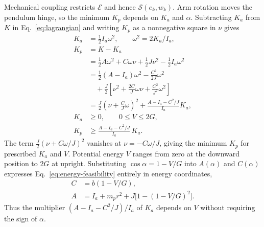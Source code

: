 \documentclass[letterpaper,10pt,conference]{ieeeconf}
\begin{document}
Mechanical coupling restricts $\mathcal E$ and hence $\mathcal S(e_k,w_k)$. Arm rotation moves the pendulum hinge, so the minimum $K_p$ depends on $K_a$ and $\alpha$. Subtracting $K_a$ from $K$ in Eq.~\eqref{eq:lagrangian} and writing $K_p$ as a nonnegative square in $\nu$ gives
\begin{equation}
\begin{aligned}
 K_a&=\tfrac12I_a\omega^2,\qquad \omega^2=2K_a/I_a,\\
 K_p&=K-K_a\\
    &=\tfrac12A\omega^2+C\omega\nu+\tfrac12J\nu^2
       -\tfrac12I_a\omega^2\\
    &=\tfrac12(A-I_a)\omega^2-\frac{C^2}{2J}\omega^2\\
    &\quad+\frac J2\left[\nu^2+\frac{2C}{J}\omega\nu
                    +\frac{C^2}{J^2}\omega^2\right]\\
    &=\frac J2\left(\nu+\frac CJ\omega\right)^2
       +\frac{A-I_a-C^2/J}{I_a}K_a,\\
 K_a&\ge0,\qquad 0\le V\le2G,\\
 K_p&\ge\frac{A-I_a-C^2/J}{I_a}\,K_a.
\end{aligned}
\label{eq:energy-feasibility}
\end{equation}
The term $\frac J2(\nu+C\omega/J)^2$ vanishes at $\nu=-C\omega/J$, giving the minimum $K_p$ for prescribed $K_a$ and $V$. Potential energy $V$ ranges from zero at the downward position to $2G$ at upright. Substituting $\cos\alpha=1-V/G$ into $A(\alpha)$ and $C(\alpha)$ expresses Eq.~\eqref{eq:energy-feasibility} entirely in energy coordinates,
\begin{equation}
\begin{aligned}
 C&=b(1-V/G),\\
 A&=I_a+m_pr^2+J\bigl[1-(1-V/G)^2\bigr].
\end{aligned}
\label{eq:energy-inertias}
\end{equation}
Thus the multiplier $(A-I_a-C^2/J)/I_a$ of $K_a$ depends on $V$ without requiring the sign of $\alpha$.
\end{document}
